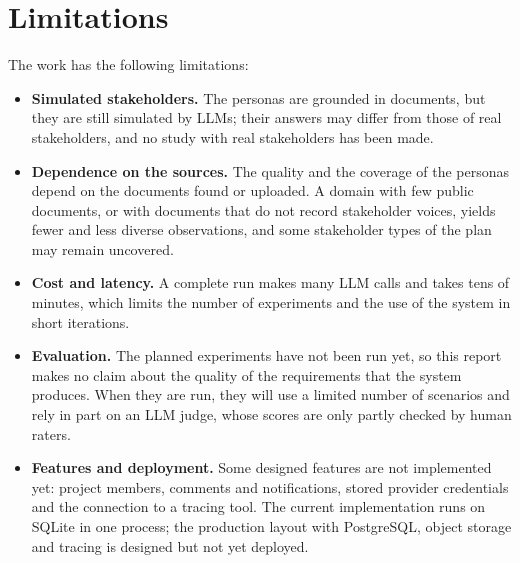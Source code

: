 \section{Limitations}
\label{sec:conc-limitations}
The work has the following limitations:
\begin{itemize}
    \item \textbf{Simulated stakeholders.} The personas are grounded in documents, but they are still simulated by LLMs; their answers may differ from those of real stakeholders, and no study with real stakeholders has been made.
    \item \textbf{Dependence on the sources.} The quality and the coverage of the personas depend on the documents found or uploaded. A domain with few public documents, or with documents that do not record stakeholder voices, yields fewer and less diverse observations, and some stakeholder types of the plan may remain uncovered.
    \item \textbf{Cost and latency.} A complete run makes many LLM calls and takes tens of minutes, which limits the number of experiments and the use of the system in short iterations.
    \item \textbf{Evaluation.} The planned experiments have not been run yet, so this report makes no claim about the quality of the requirements that the system produces. When they are run, they will use a limited number of scenarios and rely in part on an LLM judge, whose scores are only partly checked by human raters.
    \item \textbf{Features and deployment.} Some designed features are not implemented yet: project members, comments and notifications, stored provider credentials and the connection to a tracing tool. The current implementation runs on SQLite in one process; the production layout with PostgreSQL, object storage and tracing is designed but not yet deployed.
\end{itemize}

